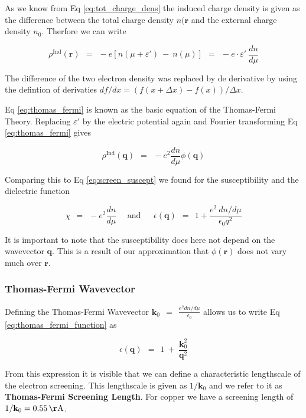 \documentclass[10pt]{report}
\numberwithin{equation}{chapter}
\newcommand{\refEq}[1]{
  Eq  \ref{#1}
}
\begin{document}
As we know from \refEq{eq:tot_charge_dens} the induced charge density is given as the difference between the total charge density $n(\mathbf{r}$ and the external charge density $n_0$. Therfore we can write

\begin{equation} \label{eq:thomas_fermi}
  \rho^\text{Ind}(\mathbf{r}) ~~=~~ -e \left[ n(\mu + \varepsilon') ~-~ n(\mu) \right] 
  ~~=~~ -e \cdot \varepsilon'\ \frac{dn}{d\mu}
\end{equation}

The difference of the two electron density was replaced by de derivative by using the defintion of derivaties $df/dx = (f(x+\Delta x) - f(x))/\Delta x$.
\refEq{eq:thomas_fermi} is known as the basic equation of the Thomas-Fermi Theory. Replacing $\varepsilon'$ by the electric potential again and Fourier transforming \refEq{eq:thomas_fermi} gives

\begin{equation}
  \rho^\text{Ind}(\mathbf{q}) ~~=~~ -e^2 \frac{dn}{d \mu} \phi(\mathbf{q})
\end{equation}

Comparing this to \refEq{eq:screen_suscept} we found for the susceptibility and the dielectric function

\begin{equation} \label{eq:thomas_fermi_function}
  \chi ~~=~~ -e^2 \frac{dn}{d \mu} ~~~~~~\text{and}~~~~~~~ 
  \epsilon(\mathbf{q}) ~~=~~ 1 + \frac{e^2\ dn/d\mu}{\epsilon_0 q^2}
\end{equation}

It is important to note that the susceptibility does here not depend on the wavevector $\mathbf{q}$. This is a result of our approximation that $\phi(\mathbf{r})$ does not vary much over $\mathbf{r}$.


\subsubsection{Thomas-Fermi Wavevector}

Defining the Thomas-Fermi Wavevector $\mathbf{k}_0 ~~=~~ \frac{e^2 dn/d\mu}{\epsilon_0}$ allows us to write \refEq{eq:thomas_fermi_function} as 

\begin{equation} \label{eq:screening_dielect_new}
  \epsilon(\mathbf{q}) ~~=~~ 1 ~+~ \frac{\mathbf{k}_0^2}{\mathbf{q}^2}
\end{equation}

From this expression it is visible that we can define a characteristic lengthscale of the electron screening. This lengthscale is given as $1/\mathbf{k}_0$ and we refer to it as \textbf{Thomas-Fermi Screening Length}. For copper we have a screening length of $1/\mathbf{k}_0 = \SI{0.55}{\AA}$.
\end{document}
